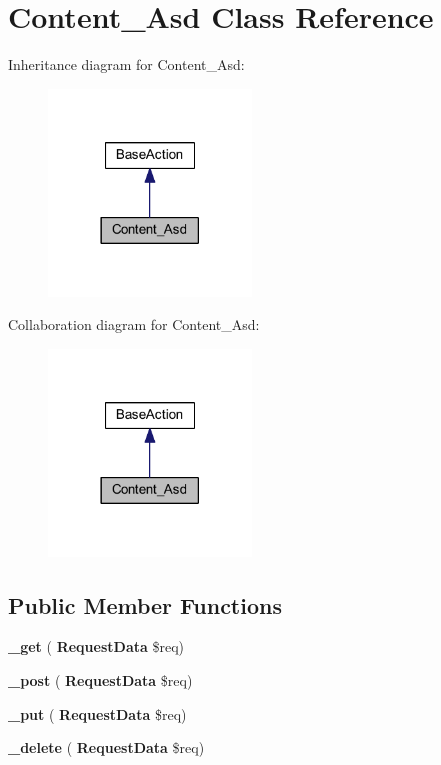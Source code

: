 \section{Content\+\_\+\+Asd Class Reference}
\label{class_lora_1_1_content_1_1_content___asd}


Inheritance diagram for Content\+\_\+\+Asd\+:\nopagebreak
\begin{figure}[H]
\begin{center}
\leavevmode
\includegraphics[width=153pt]{class_lora_1_1_content_1_1_content___asd__inherit__graph}
\end{center}
\end{figure}


Collaboration diagram for Content\+\_\+\+Asd\+:\nopagebreak
\begin{figure}[H]
\begin{center}
\leavevmode
\includegraphics[width=153pt]{class_lora_1_1_content_1_1_content___asd__coll__graph}
\end{center}
\end{figure}
\subsection*{Public Member Functions}
\begin{DoxyCompactItemize}
\item 
\mbox{\label{class_lora_1_1_content_1_1_content___asd_a3ad4bf1b146a3180b34d1327ff2abf69}} 
{\bfseries \+\_\+get} (\textbf{ Request\+Data} \$req)
\item 
\mbox{\label{class_lora_1_1_content_1_1_content___asd_a50751d47a139282d1c3b08cab1b6562e}} 
{\bfseries \+\_\+post} (\textbf{ Request\+Data} \$req)
\item 
\mbox{\label{class_lora_1_1_content_1_1_content___asd_a2affcc8f31c13147c33450193b229194}} 
{\bfseries \+\_\+put} (\textbf{ Request\+Data} \$req)
\item 
\mbox{\label{class_lora_1_1_content_1_1_content___asd_ab8ddc6de1e04524212f7d55893f78864}} 
{\bfseries \+\_\+delete} (\textbf{ Request\+Data} \$req)
\end{DoxyCompactItemize}
